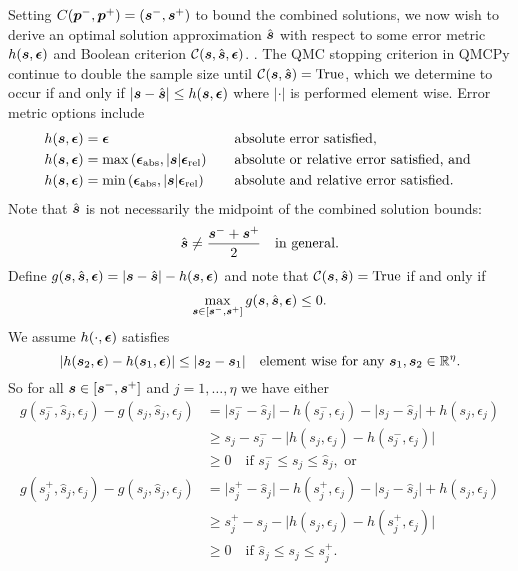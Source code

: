 \documentclass{article}
\newcommand{\bepsabs}{\boldsymbol{\epsilon}_\text{abs}}
\newcommand{\bepsrel}{\boldsymbol{\epsilon}_\text{rel}}
\begin{document}
Setting $C(\boldsymbol{p}^-,\boldsymbol{p}^+) = (\boldsymbol{s}^-,\boldsymbol{s}^+)$ to bound the combined solutions, we now wish to derive an optimal solution approximation $\hat{\boldsymbol{s}}$ with respect to some error metric $h(\boldsymbol{s},\boldsymbol{\epsilon})$ and Boolean criterion $\mathcal{C}(\boldsymbol{s},\hat{\boldsymbol{s}},\boldsymbol{\epsilon})$.  . The QMC stopping criterion in QMCPy continue to double the sample size until $\mathcal{C}(\boldsymbol{s},\hat{\boldsymbol{s}})=\text{True}$, which we determine to occur if and only if $\lvert \boldsymbol{s} - \hat{\boldsymbol{s}} \rvert \leq h(\boldsymbol{s},\boldsymbol{\epsilon})$ where $\lvert \cdot \rvert$ is performed element wise. Error metric options include
\begin{align}
    h(\bs,\bepsilon) & = \bepsilon \quad &&\text{absolute error satisfied}, \\
    h(\bs,\bepsilon) &= \max\left(\bepsabs,\lvert \bs \rvert \bepsrel \right) \quad &&\text{absolute or relative error satisfied, and } \label{eq:h_abs_or_rel} \\
    h(\bs,\bepsilon) &= \min\left(\bepsabs,\lvert \bs \rvert \bepsrel \right) \quad &&\text{absolute and relative error satisfied.} \label{eq:h_abs_and_rel}
\end{align}
Note that $\hat{\boldsymbol{s}}$ is not necessarily the midpoint of the combined solution bounds:
\begin{equation}
    \hat{\boldsymbol{s}} \neq \frac{\boldsymbol{s}^-+\boldsymbol{s}^+}{2} \quad \text{in general.}
\end{equation}
Define $g(\boldsymbol{s},\hat{\boldsymbol{s}},\boldsymbol{\epsilon})=\lvert \boldsymbol{s} - \hat{\boldsymbol{s}}\rvert -h(\boldsymbol{s},\boldsymbol{\epsilon})$ and note that $\mathcal{C}(\boldsymbol{s},\hat{\boldsymbol{s}})=\text{True}$ if and only if 
\begin{equation}
    \max_{\boldsymbol{s} \in [\boldsymbol{s}^-,\boldsymbol{s}^+]} g(\boldsymbol{s},\hat{\boldsymbol{s}},\boldsymbol{\epsilon}) \leq 0.
\end{equation}
We assume $h(\cdot,\boldsymbol{\epsilon})$ satisfies 
\begin{equation}
    \lvert h(\boldsymbol{s}_2,\boldsymbol{\epsilon}) - h(\boldsymbol{s}_1,\boldsymbol{\epsilon}) \rvert \leq \lvert \boldsymbol{s}_2 - \boldsymbol{s}_1 \rvert \quad \text{element wise for any } \boldsymbol{s}_1,\boldsymbol{s}_2 \in \mathbb{R}^\eta.
\end{equation}
So for all $\boldsymbol{s} \in [\boldsymbol{s}^-,\boldsymbol{s}^+]$ and $j=1,\dots,\eta$ we have either
\begin{align}
    g(s_j^-,\hat{s}_j,\epsilon_j)-g(s_j,\hat{s}_j,\epsilon_j) 
    &= \lvert s_j^- - \hat{s}_j \rvert -h(s_j^-,\epsilon_j) - \lvert s_j - \hat{s}_j \rvert  + h(s_j,\epsilon_j) \\
    &\geq s_j - s_j^- - \lvert h(s_j,\epsilon_j)-h(s_j^-,\epsilon_j) \rvert \\
    &\geq 0 \quad \text{if } s_j^- \leq s_j \leq \hat{s}_j, \text{ or} \\
    g(s_j^+,\hat{s}_j,\epsilon_j)-g(s_j,\hat{s}_j,\epsilon_j) 
    &= \lvert s_j^+ - \hat{s}_j \rvert -h(s_j^+,\epsilon_j) - \lvert s_j - \hat{s}_j \rvert  + h(s_j,\epsilon_j) \\
    &\geq s_j^+ - s_j - \lvert h(s_j,\epsilon_j)-h(s_j^+,\epsilon_j) \rvert \\
    &\geq 0 \quad \text{if } \hat{s}_j \leq s_j \leq s_j^+.
\end{align}
\end{document}
